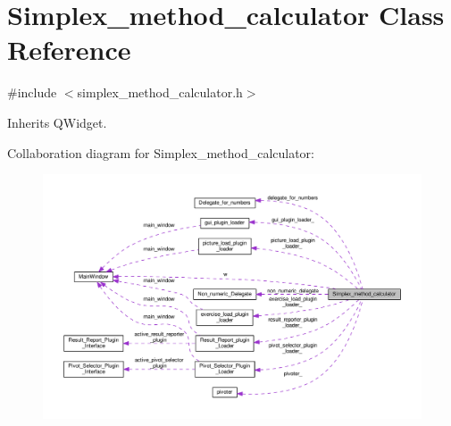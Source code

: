 \hypertarget{classSimplex__method__calculator}{}\section{Simplex\+\_\+method\+\_\+calculator Class Reference}
\label{classSimplex__method__calculator}


{\ttfamily \#include $<$simplex\+\_\+method\+\_\+calculator.\+h$>$}



Inherits Q\+Widget.



Collaboration diagram for Simplex\+\_\+method\+\_\+calculator\+:\nopagebreak
\begin{figure}[H]
\begin{center}
\leavevmode
\includegraphics[width=350pt]{classSimplex__method__calculator__coll__graph}
\end{center}
\end{figure}
